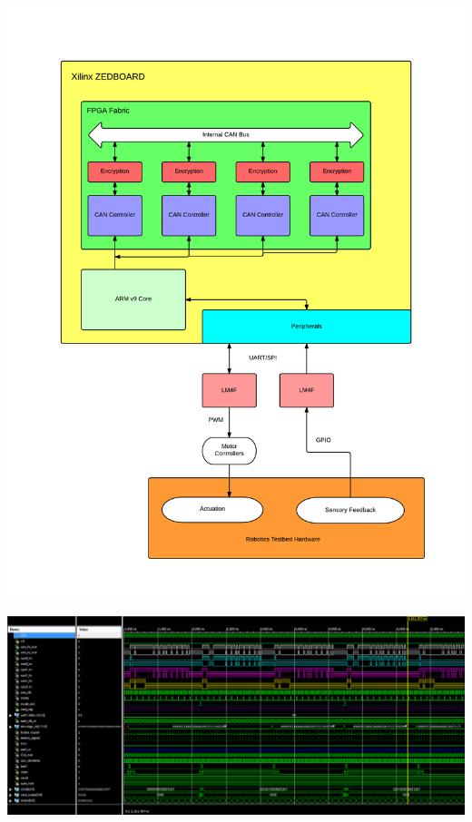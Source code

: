 \documentclass[a0,landscape]{a0poster}
\begin{document}
\begin{multicols}{3}
\begin{vwcol}[widths={0.4,0.6}]
\end{vwcol}


\centerline{\includegraphics[scale=0.9]{fpga_layout}}
\vspace{1em}
\centerline{\includegraphics[width=0.9\linewidth]{FPGA_Sim1}}


\end{multicols}
\end{document}
